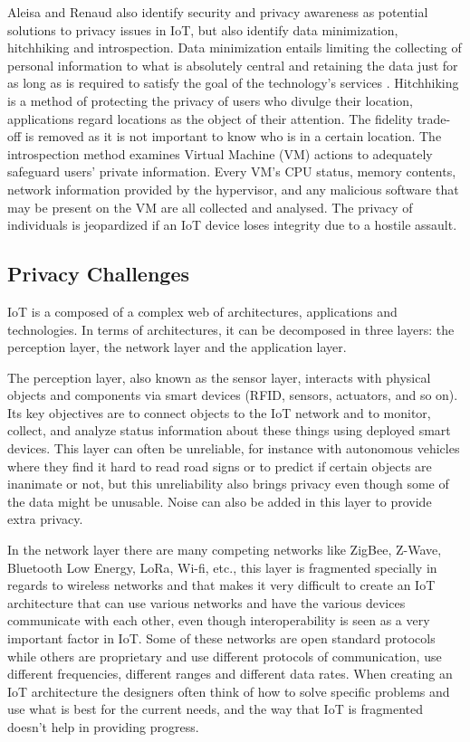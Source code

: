 Aleisa and Renaud \cite{aleisa2016privacy} also identify security and privacy
awareness as potential solutions to privacy issues in IoT, but also identify
data minimization, hitchhiking and introspection. Data minimization entails
limiting the collecting of personal information to what is absolutely central
and retaining the data just for as long as is required to satisfy the goal
of the technology's services \cite{ojDirective281}. Hitchhiking \cite{tang2006putting}
is a method of protecting the privacy of users who divulge their location,
applications regard locations as the object of their attention. The fidelity
trade-off is removed as it is not important to know who is in a certain
location. The introspection \cite{kang2015protection} method examines Virtual
Machine (VM) actions to adequately safeguard users' private information.
Every VM's CPU status, memory contents, network information provided by the
hypervisor, and any malicious software that may be present on the VM are
all collected and analysed. The privacy of individuals is jeopardized if
an IoT device loses integrity due to a hostile assault.

\subsection{Privacy Challenges}

IoT is a composed of a complex web of architectures, applications and technologies.
In terms of architectures, it can be decomposed in three layers: the perception
layer, the network layer and the application layer.

The perception layer, also known as the sensor layer, interacts with physical
objects and components via smart devices (RFID, sensors, actuators, and
so on). Its key objectives are to connect objects to the IoT network and
to monitor, collect, and analyze status information about these things using
deployed smart devices. This layer can often be unreliable, for instance
with autonomous vehicles where they find it hard to read road signs or to
predict if certain objects are inanimate or not, but this unreliability
also brings privacy even though some of the data might be unusable. Noise
can also be added in this layer to provide extra privacy.

In the network layer there are many competing networks like ZigBee, Z-Wave,
Bluetooth Low Energy, LoRa, Wi-fi, etc., this layer is fragmented specially
in regards to wireless networks and that makes it very difficult to create
an IoT architecture that can use various networks and have the various
devices communicate with each other, even though interoperability is seen
as a very important factor in IoT. Some of these networks are open standard
protocols while others are proprietary and use different protocols of communication,
use different frequencies, different ranges and different data rates. When
creating an IoT architecture the designers often think of how to solve
specific problems and use what is best for the current needs, and the way
that IoT is fragmented doesn't help in providing progress.

